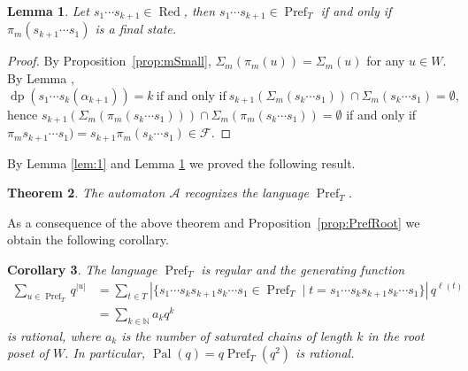 \documentclass{amsart}
\newtheorem{Theorem}{Theorem}[section]
\newtheorem{Lemma}[Theorem]{Lemma}
\newtheorem{Corollary}[Theorem]{Corollary}
\theoremstyle{definition}
\newcommand{\Red}{{\operatorname{Red}}}
\newcommand{\dep}{\operatorname{dp}}
\newcommand{\RPal}{\operatorname{Pal}}
\newcommand{\Pref}{\operatorname{Pref}}
\begin{document}
\begin{Lemma}\label{lem:2}
Let $s_1\cdots s_{k+1}\in \Red$, then $s_1\cdots s_{k+1}\in\Pref_T$ if and only if $\pi_m(s_{k+1}\cdots s_{1})$ is a final state.
\end{Lemma}

\begin{proof}
By Proposition~\ref{prop:mSmall}, $\Sigma_m(\pi_m(u))=\Sigma_m(u)$ for any $u\in W$. By Lemma \cite[Lemma 2.4]{DM}, $$\dep(s_1\cdots s_{k}(\alpha_{k+1}))=k \ \mbox{if and only if} \ s_{k+1}(\Sigma_m(s_k\cdots s_1))\cap \Sigma_m(s_k\cdots s_1)=\emptyset,$$ hence $s_{k+1}(\Sigma_m(\pi_m(s_k\cdots s_1)))\cap \Sigma_m(\pi_m(s_k\cdots s_1))=\emptyset$ if and only if $\pi_m s_{k+1}\cdots s_{1})=s_{k+1}\pi_m(s_{k}\cdots s_{1})\in \mathcal{F}$.
\end{proof}

By Lemma \ref{lem:1} and Lemma \ref{lem:2} we proved the following result.
\begin{Theorem}
The automaton $\mathcal{A}$ recognizes the language $\Pref_T$.
\end{Theorem}
  
 As a consequence of the above theorem and Proposition~\ref{prop:PrefRoot} we obtain the following corollary.
  
  
  
\begin{Corollary}\label{cor:Refregular}
The language $\Pref_T$ is regular and the generating function 
\begin{align*}
\sum_{u\in \Pref_T} q^{|u|}& =\sum_{t\in T} |\{s_1 \cdots s_k s_{k+1} s_k\cdots s_1 \in \Pref_T \mid t=s_1 \cdots s_k s_{k+1}s_k\cdots s_1\}| \, q^{\ell(t)}\\
&=\sum_{k\in\mathbb{N}} a_k q^k
\end{align*}
is rational, where $a_k$ is the number of saturated chains of length $k$ in the root poset of $W$. In particular, $\RPal(q)=q\Pref_T(q^2)$ is rational.
\end{Corollary}
\end{document}
